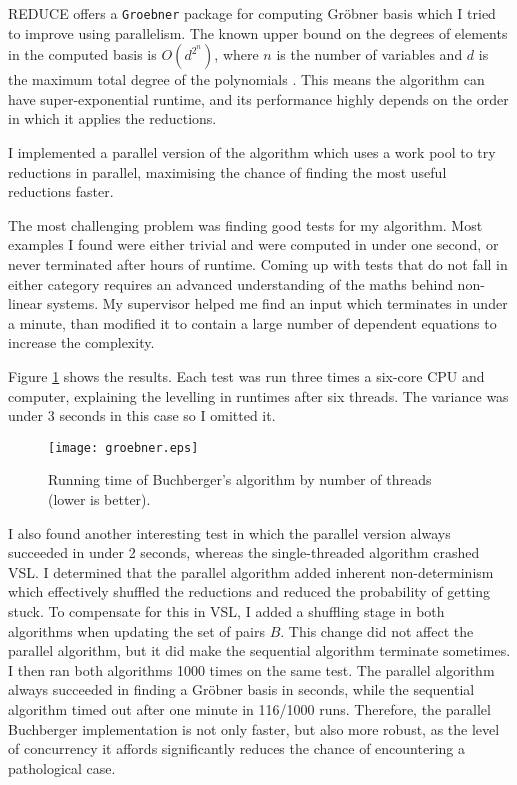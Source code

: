 REDUCE offers a \verb|Groebner| package for computing Gröbner basis which I tried
to improve using parallelism. The known upper bound on the degrees of elements
in the computed basis is $O(d^{2^n})$, where $n$ is the number of variables
and $d$ is the maximum total degree of the polynomials \cite{MAYR}. This means the
algorithm can have super-exponential runtime, and its performance highly
depends on the order in which it applies the reductions.

I implemented a parallel version of the algorithm which uses a work
pool to try reductions in parallel, maximising the chance of finding the most useful reductions
faster.

The most challenging problem was finding good tests for my algorithm.
Most examples I found were either trivial and were computed in under one
second, or never terminated after hours of runtime. Coming up with
tests that do not fall in either category requires an advanced understanding
of the maths behind non-linear systems. My supervisor helped me
find an input which terminates in under a minute, than modified it
to contain a large number of dependent equations to increase the complexity.

Figure \ref{fig:groebner} shows the results. Each test was run three times
a six-core CPU and computer, explaining the levelling in runtimes after
six threads. The variance was under 3 seconds in this case so I omitted it.

\begin{figure}[H]
  \centering
  \texttt{[image: groebner.eps]}
  \caption[Buchberger's algorithm running time by number of threads.]{Running time of Buchberger's
  algorithm by number of threads (lower is better).}
  \label{fig:groebner}
\end{figure}

I also found another interesting test in which the parallel version
always succeeded in under 2 seconds, whereas the single-threaded algorithm
crashed VSL. I determined that the parallel algorithm added inherent
non-determinism which effectively shuffled the reductions and
reduced the probability of getting stuck.
To compensate for this in VSL, I added a shuffling stage in both algorithms
when updating the set of pairs $B$. This change did not affect the parallel
algorithm, but it did make the sequential algorithm terminate sometimes.
I then ran both algorithms 1000 times on the same test. The parallel
algorithm always succeeded in finding a Gröbner basis in seconds,
while the sequential algorithm timed out after one minute in 116/1000 runs.
Therefore, the parallel Buchberger implementation is not only faster,
but also more robust, as the level of concurrency it affords significantly
reduces the chance of encountering a pathological case.

